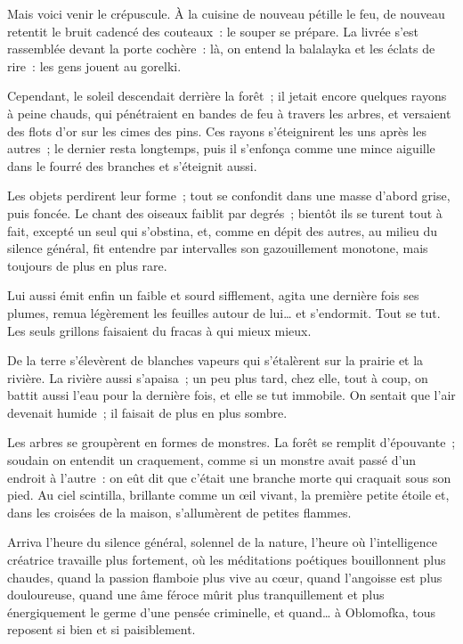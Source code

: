 \documentclass[french,twoside]{book} %
\begin{document}
Mais voici venir le crépuscule. À la cuisine de nouveau pétille le feu, de nouveau retentit le bruit cadencé des couteaux : le souper se prépare. La livrée s’est rassemblée devant la porte cochère : là, on entend la balalayka et les éclats de rire : les gens jouent au gorelki.\par
Cependant, le soleil descendait derrière la forêt ; il jetait encore quelques rayons à peine chauds, qui pénétraient en bandes de feu à travers les arbres, et versaient des flots d’or sur les cimes des pins. Ces rayons s’éteignirent les uns après les autres ; le dernier resta longtemps, puis il s’enfonça comme une mince aiguille dans le fourré des branches et s’éteignit aussi.\par
Les objets perdirent leur forme ; tout se confondit dans une masse d’abord grise, puis foncée. Le chant des oiseaux faiblit par degrés ; bientôt ils se turent tout à fait, excepté un seul qui s’obstina, et, comme en dépit des autres, au milieu du silence général, fit entendre par intervalles son gazouillement monotone, mais toujours de plus en plus rare.\par
Lui aussi émit enfin un faible et sourd sifflement, agita une dernière fois ses plumes, remua légèrement les feuilles autour de lui… et s’endormit. Tout se tut. Les seuls grillons faisaient du fracas à qui mieux mieux.\par
De la terre s’élevèrent de blanches vapeurs qui s’étalèrent sur la prairie et la rivière. La rivière aussi s’apaisa ; un peu plus tard, chez elle, tout à coup, on battit aussi l’eau pour la dernière fois, et elle se tut immobile. On sentait que l’air devenait humide ; il faisait de plus en plus sombre.\par
Les arbres se groupèrent en formes de monstres. La forêt se remplit d’épouvante ; soudain on entendit un craquement, comme si un monstre avait passé d’un endroit à l’autre : on eût dit que c’était une branche morte qui craquait sous son pied. Au ciel scintilla, brillante comme un œil vivant, la première petite étoile et, dans les croisées de la maison, s’allumèrent de petites flammes.\par
Arriva l’heure du silence général, solennel de la nature, l’heure où l’intelligence créatrice travaille plus fortement, où les méditations poétiques bouillonnent plus chaudes, quand la passion flamboie plus vive au cœur, quand l’angoisse est plus douloureuse, quand une âme féroce mûrit plus tranquillement et plus énergiquement le germe d’une pensée criminelle, et quand… à Oblomofka, tous reposent si bien et si paisiblement.\par
\end{document}
